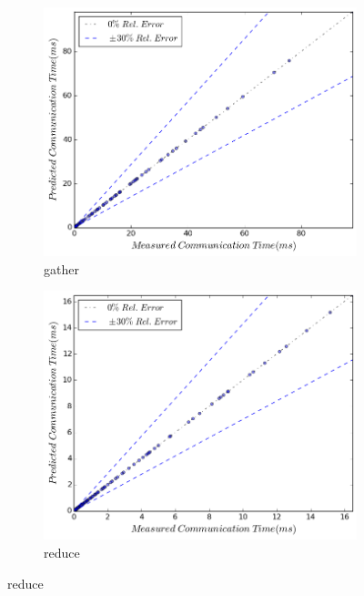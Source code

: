 \begin{figure}[H]
    \centering
    \captionsetup{justification=centering,margin=0cm,font=footnotesize}
    \begin{subfigure}[b]{0.4\textwidth}
        \includegraphics[width=\textwidth]{./images/all_NUMA/gather.png}
        \caption{gather}
    \end{subfigure}
    \quad 
    \begin{subfigure}[b]{0.4\textwidth}
        \includegraphics[width=\textwidth]{./images/all_NUMA/reduce.png}
        \caption{reduce}
    \end{subfigure}
    \quad 

\end{figure}
